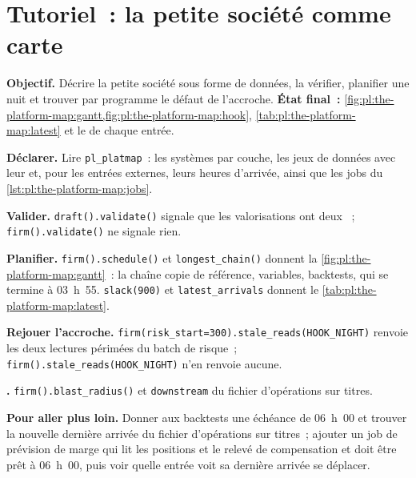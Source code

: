 \section{Tutoriel~: la petite société comme carte}\label{tut:pl:the-platform-map:tut}

\begin{tutorial}
\textbf{Objectif.} Décrire la petite société sous forme de données, la vérifier, planifier une nuit et trouver par programme le défaut de l'accroche.
\textbf{État final~:} \cref{fig:pl:the-platform-map:gantt,fig:pl:the-platform-map:hook}, \cref{tab:pl:the-platform-map:latest}
et le  de chaque entrée.
\begin{tutsteps}
\item \textbf{Déclarer.} Lire \texttt{pl\_platmap}~: les systèmes par couche, les jeux de données avec leur  et, pour les entrées externes,
leurs heures d'arrivée, ainsi que les jobs du \cref{lst:pl:the-platform-map:jobs}.
\item \textbf{Valider.} \texttt{draft().validate()} signale que les valorisations ont deux ~; \texttt{firm().validate()}
ne signale rien.
\item \textbf{Planifier.} \texttt{firm().schedule()} et \texttt{longest\_chain()} donnent la \cref{fig:pl:the-platform-map:gantt}~:
la chaîne copie de référence, variables, backtests, qui se termine à 03~h~55. \texttt{slack(900)} et \texttt{latest\_arrivals} donnent
le \cref{tab:pl:the-platform-map:latest}.
\item \textbf{Rejouer l'accroche.} \texttt{firm(risk\_start=300).stale\_reads(HOOK\_NIGHT)} renvoie les deux lectures périmées du
batch de risque~; \texttt{firm().stale\_reads(HOOK\_NIGHT)} n'en renvoie aucune.
\item \textbf{.} \texttt{firm().blast\_radius()} et \texttt{downstream} du fichier d'opérations sur titres.
\end{tutsteps}
\textbf{Pour aller plus loin.} Donner aux backtests une échéance de 06~h~00 et trouver la nouvelle dernière arrivée du fichier d'opérations sur titres~;
ajouter un job de prévision de marge qui lit les positions et le relevé de compensation et doit être prêt à 06~h~00, puis voir
quelle entrée voit sa dernière arrivée se déplacer.
\end{tutorial}

